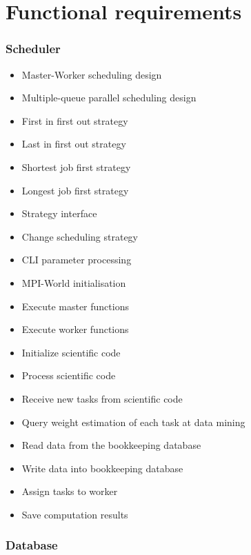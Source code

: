 {


\setcounter{func}{10}
\renewcommand{\labelitemi}{
	\ifnum \value{func}<10$/F 0\arabic{func} /$\addtocounter{func}{10}
	\else $/F \arabic{func} /$\addtocounter{func}{10}\fi
	}

\section{Functional requirements} 
	
	\subsubsection{Scheduler}
	
		\begin{itemize}
			\item Master-Worker scheduling design
			\item Multiple-queue parallel scheduling design
			\item First in first out strategy
			\item Last in first out strategy
			\item Shortest job first strategy
			\item Longest job first strategy 
			\item Strategy interface
			\item Change scheduling strategy
			\item CLI parameter processing
			\item MPI-World initialisation
			\item Execute master functions
			\item Execute worker functions
			\item Initialize scientific code
			\item Process scientific code 
			\item Receive new tasks from scientific code
			\item Query weight estimation of each task at data mining
			\item Read data from the bookkeeping database
			\item Write data into bookkeeping database
			\item Assign tasks to worker
			\item Save computation results
		\end{itemize}
	
	\subsubsection{Database}
	
}
